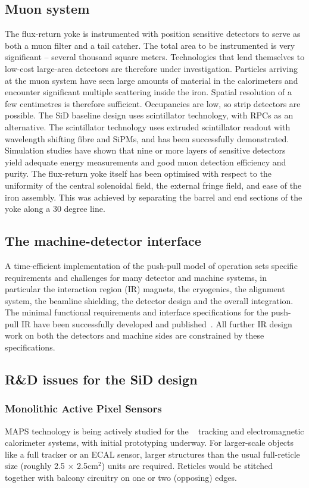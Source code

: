 \subsection{Muon system}
The flux-return yoke is instrumented with position sensitive detectors to
serve as both a muon filter and a tail catcher. The total area to be
instrumented is very significant -- several thousand square meters. Technologies
that lend themselves to low-cost large-area detectors are therefore under
investigation. Particles arriving at the muon system have seen large amounts of
material in the calorimeters and encounter significant multiple scattering
inside the iron. Spatial resolution of a few centimetres is therefore
sufficient. Occupancies are low, so strip detectors are possible. The SiD 
baseline design uses scintillator technology, with RPCs as an alternative. 
The scintillator technology uses extruded scintillator readout with wavelength 
shifting fibre and SiPMs, and has been successfully demonstrated. 
Simulation studies have shown that nine or more layers of sensitive detectors 
yield adequate energy measurements and good muon detection efficiency and purity.
The flux-return yoke itself has been optimised with respect to the
uniformity of the central solenoidal field, the external fringe field,
and ease of the iron assembly. 
This was achieved by separating the  barrel and end sections of the
yoke along a 30 degree line.

\subsection{The machine-detector interface}
A time-efficient implementation of the push-pull model of
operation sets specific requirements and challenges for many detector and
machine systems, in particular the interaction region (IR) magnets, the
cryogenics, the alignment system, the beamline shielding, the detector design
and the overall integration. The minimal functional requirements and interface
specifications for the push-pull IR have been successfully developed and
published~\cite{Parker:2009zz,Buesser:2012et}.  All further IR design
work on both the detectors and machine sides are constrained by these 
specifications.


\subsection{R\&D issues for the SiD design}
\label{SiD-RandD}

\subsubsection{Monolithic Active Pixel Sensors}
MAPS technology is being actively studied for the \sid~ tracking and electromagnetic calorimeter systems, with initial prototyping underway.
For larger-scale objects like a full tracker or an ECAL sensor, larger structures than the usual full-reticle size (roughly 2.5 $\times$ {2.5}{cm$^2$}) units are required.
Reticles would be stitched together with balcony circuitry on one or two (opposing) edges. 

